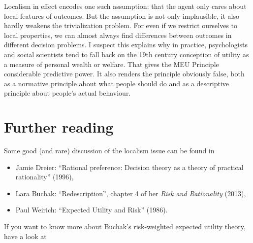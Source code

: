 Localism in effect encodes one such assumption: that the agent only
cares about local features of outcomes. But the assumption is not only
implausible, it also hardly weakens the trivialization problem. For
even if we restrict ourselves to local properties, we can almost
always find differences between outcomes in different decision
problems. I suspect this explains why in practice, psychologists and
social scientists tend to fall back on the 19th century conception of
utility as a measure of personal wealth or welfare. That gives the MEU
Principle considerable predictive power. It also renders the principle
obviously false, both as a normative principle about what people
should do and as a descriptive principle about people's actual behaviour.




\section{Further reading}

Some good (and rare) discussion of the localism issue can be found in

\begin{itemize}
\item Jamie Dreier: ``Rational preference: Decision theory as a theory of practical rationality'' (1996), 
\item Lara Buchak: ``Redescription'', chapter 4 of her \emph{Risk and Rationality} (2013),
\item Paul Weirich: ``Expected Utility and Risk'' (1986).
\end{itemize}
%
If you want to know more about Buchak's risk-weighted expected utility
theory, have a look at

